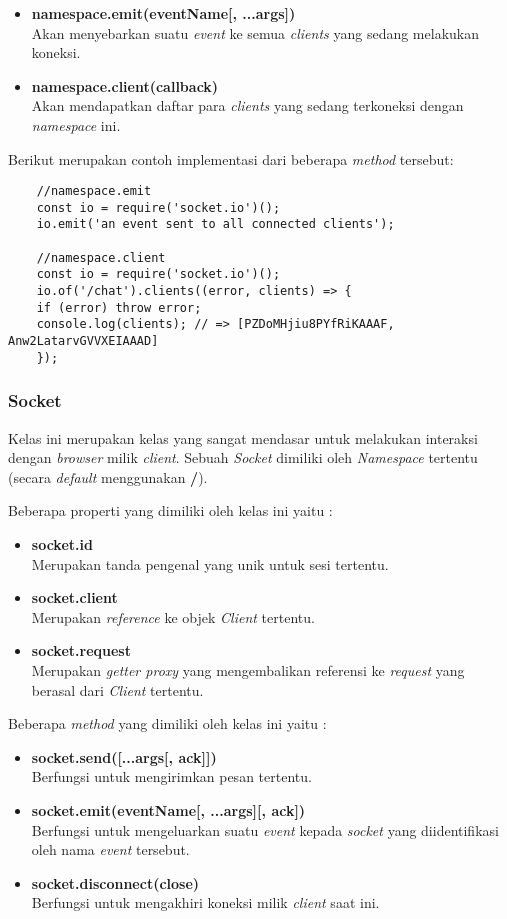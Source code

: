 \begin{itemize}
	\item \textbf{namespace.emit(eventName[, ...args])} \\ Akan menyebarkan suatu \textit{event} ke semua \textit{clients} yang sedang melakukan koneksi.
	
	\item \textbf{namespace.client(callback)} \\ Akan mendapatkan daftar para \textit{clients} yang sedang terkoneksi dengan \textit{namespace} ini.
\end{itemize}

Berikut merupakan contoh implementasi dari beberapa \textit{method} tersebut:

\begin{lstlisting}
	//namespace.emit
	const io = require('socket.io')();
	io.emit('an event sent to all connected clients');
	
	//namespace.client
	const io = require('socket.io')();
	io.of('/chat').clients((error, clients) => {
	if (error) throw error;
	console.log(clients); // => [PZDoMHjiu8PYfRiKAAAF, Anw2LatarvGVVXEIAAAD]
	});
\end{lstlisting}

\subsubsection{Socket}
Kelas ini merupakan kelas yang sangat mendasar untuk melakukan interaksi dengan \textit{browser} milik \textit{client}. Sebuah \textit{Socket} dimiliki oleh \textit{Namespace} tertentu (secara \textit{default} menggunakan \textbf{/}).

Beberapa properti yang dimiliki oleh kelas ini yaitu : 
\begin{itemize}
	\item \textbf{socket.id} \\ Merupakan tanda pengenal yang unik untuk sesi tertentu.
	\item \textbf{socket.client} \\ Merupakan \textit{reference} ke objek \textit{Client} tertentu.
	\item \textbf{socket.request} \\ Merupakan \textit{getter proxy} yang mengembalikan referensi ke \textit{request} yang berasal dari \textit{Client} tertentu.
\end{itemize}

Beberapa \textit{method} yang dimiliki oleh kelas ini yaitu : 
\begin{itemize}
	\item \textbf{socket.send([...args[, ack]])} \\ Berfungsi untuk mengirimkan pesan tertentu.
	\item \textbf{socket.emit(eventName[, ...args][, ack])} \\ Berfungsi untuk mengeluarkan suatu \textit{event} kepada \textit{socket} yang diidentifikasi oleh nama \textit{event} tersebut.
	\item \textbf{socket.disconnect(close)} \\ Berfungsi untuk mengakhiri koneksi milik \textit{client} saat ini.
\end{itemize}

